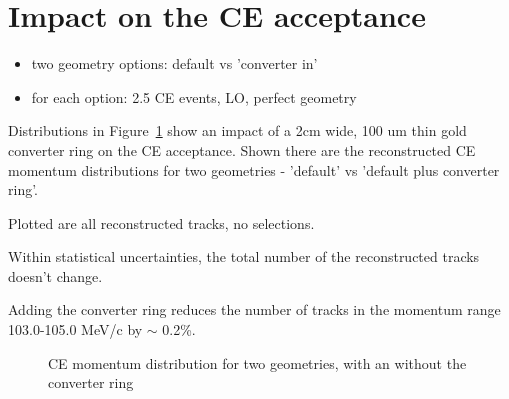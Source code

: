 %
\section{Impact on the CE acceptance}

\begin{itemize}
\item
  two geometry options: default vs 'converter in'
\item
  for each option: 2.5 CE events, LO, perfect geometry
\end{itemize}

Distributions in Figure~\ref{figure:ce_momentum} show an impact of a 2cm wide, 100 um thin
gold converter ring on the CE acceptance. Shown there are the reconstructed CE momentum
distributions for two geometries - 'default' vs 'default plus converter ring'.

Plotted are all reconstructed tracks, no selections.

Within statistical uncertainties, the total number of the reconstructed tracks doesn't change.

Adding the converter ring reduces the number of tracks in the momentum range 103.0-105.0 MeV/c
by $\sim$ 0.2\%.

\begin{figure}[H]
  \caption{
    \label{figure:ce_acceptance}
    CE momentum distribution for two geometries, with an without the converter ring
  }
  \label{figure:ce_momentum}
\end{figure}


